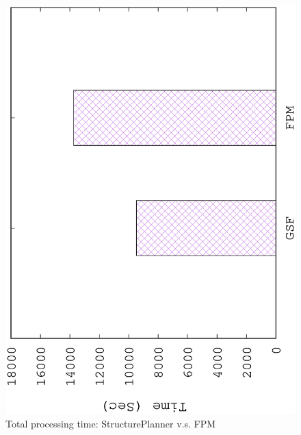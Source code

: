 \begin{figure}[H]
	\centering
	\includegraphics[scale=0.5, angle=270]{plot/fpm}
	\caption{Total processing time: StructurePlanner v.s. FPM}
	\label{fig:fpm}
\end{figure}

